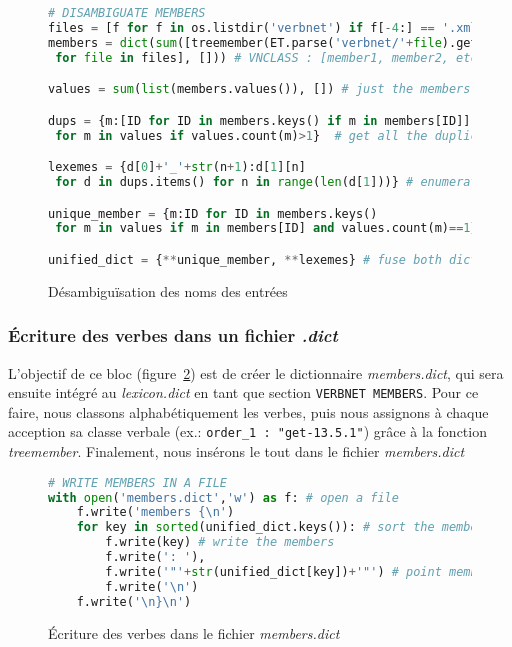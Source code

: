 \begin{figure}[htb]
\begin{lstlisting}[language=Python]
# DISAMBIGUATE MEMBERS
files = [f for f in os.listdir('verbnet') if f[-4:] == '.xml']
members = dict(sum([treemember(ET.parse('verbnet/'+file).getroot())
 for file in files], [])) # VNCLASS : [member1, member2, etc. ]

values = sum(list(members.values()), []) # just the members of all classes

dups = {m:[ID for ID in members.keys() if m in members[ID]]
 for m in values if values.count(m)>1}  # get all the duplicates

lexemes = {d[0]+'_'+str(n+1):d[1][n]
 for d in dups.items() for n in range(len(d[1]))} # enumerate all duplicates: eat_1, eat_2

unique_member = {m:ID for ID in members.keys() 
 for m in values if m in members[ID] and values.count(m)==1} #  get all unique lexemes

unified_dict = {**unique_member, **lexemes} # fuse both dict. to get all members disambiguated
\end{lstlisting}
  \caption{Désambiguïsation des noms des entrées}
	\label{fig:scriptmember-bloc2}
\end{figure}

\subsubsection{Écriture des verbes dans un fichier \emph{.dict}}

L'objectif de ce bloc (figure~\ref{fig:scriptmember-bloc3}) est de créer le dictionnaire \emph{members.dict}, qui sera ensuite intégré au \emph{lexicon.dict} en tant que section \texttt{VERBNET MEMBERS}. Pour ce faire, nous classons alphabétiquement les verbes, puis nous assignons à chaque acception sa classe verbale (ex.: \lstinline|order_1 : "get-13.5.1"|) grâce à la fonction \emph{treemember}. Finalement, nous insérons le tout dans le fichier \emph{members.dict}

\begin{figure}[htb]
\begin{lstlisting}[language=Python]
# WRITE MEMBERS IN A FILE
with open('members.dict','w') as f: # open a file
    f.write('members {\n')
    for key in sorted(unified_dict.keys()): # sort the members
        f.write(key) # write the members
        f.write(': '),
        f.write('"'+str(unified_dict[key])+'"') # point members towards ID of VNCLASS
        f.write('\n')
    f.write('\n}\n')
\end{lstlisting}
  \caption{Écriture des verbes dans le fichier \emph{members.dict}}
	\label{fig:scriptmember-bloc3}
\end{figure}

